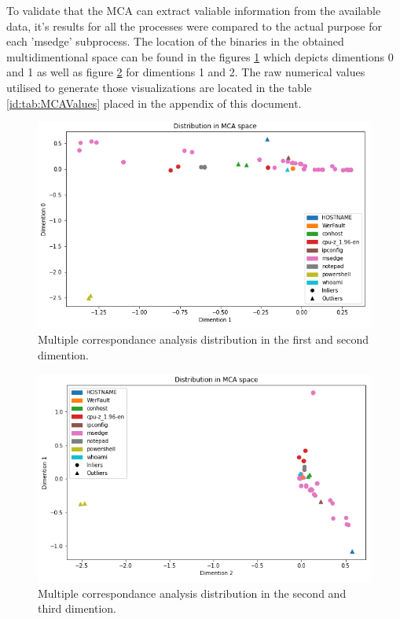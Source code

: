 \documentclass[a4paper,twoside,12pt]{book}
\begin{document}
To validate that the MCA can extract valiable information from the available data, it's results for all
the processes were compared to the actual purpose for each 'msedge' subprocess. The location of the
binaries in the obtained multidimentional space can be found in the figures \ref{fig:mca01} which 
depicts dimentions 0 and 1 as well as figure \ref{fig:mca12} for dimentions 1 and 2. The raw numerical 
values utilised to generate those visualizations are located in the table \ref{id:tab:MCAValues} placed 
in the appendix of this document. 


\begin{figure}
	\centering
	\includegraphics[scale=0.9]{images/MCA01}
	\caption{Multiple correspondance analysis distribution in the first and second dimention.}
	\label{fig:mca01}
 \end{figure}

 \begin{figure}
	\centering
	\includegraphics[scale=0.9]{images/MCA12}
	\caption{Multiple correspondance analysis distribution in the second and third dimention.}
	\label{fig:mca12}
 \end{figure}
\end{document}
